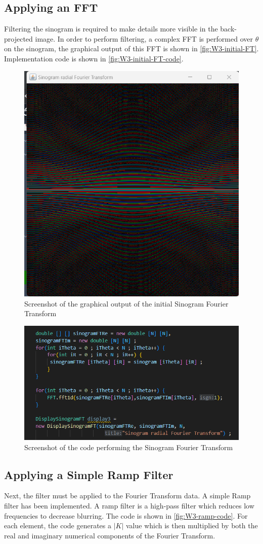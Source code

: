 \subsection{Applying an FFT}
Filtering the sinogram is required to make details more visible in the back-projected image. In order to perform filtering, a complex FFT is performed over \(\theta\) on the sinogram, the graphical output of this FFT is shown in \autoref{fig:W3-initial-FT}. Implementation code is shown in \autoref{fig:W3-initial-FT-code}.

\begin{figure}[H] 
    \centering
    \includegraphics[width=0.49\columnwidth]{Figures/Week 3/initial-FFTpng.png}
    \caption{Screenshot of the graphical output of the initial Sinogram Fourier Transform}
    \label{fig:W3-initial-FT}
\end{figure}
\begin{figure}[H] 
    \centering
    \includegraphics[width=0.9\columnwidth]{Figures/Week 3/initial-FFT-code.png}
    \caption{Screenshot of the code performing the Sinogram Fourier Transform}
    \label{fig:W3-initial-FT-code}
\end{figure}




\subsection{Applying a Simple Ramp Filter}
Next, the filter must be applied to the Fourier Transform data. A simple Ramp filter has been implemented. A ramp filter is a high-pass filter which reduces low frequencies to decrease blurring. The code is shown in \autoref{fig:W3-ramp-code}. For each element, the code generates a $|K|$ value which is then multiplied by both the real and imaginary numerical components of the Fourier Transform.

